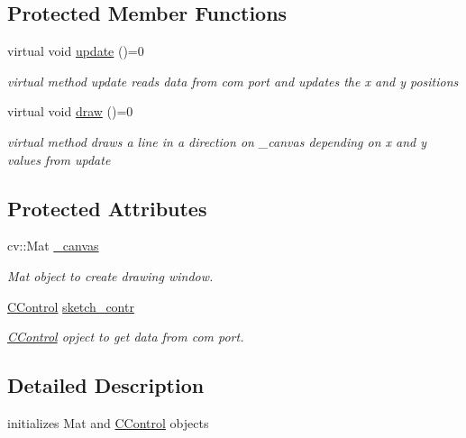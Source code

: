 \subsection*{Protected Member Functions}
\begin{DoxyCompactItemize}
\item 
virtual void \hyperlink{class_c_base4618_a1e2f3c16eb99b5bfdd5d5254aee39ee6}{update} ()=0
\begin{DoxyCompactList}\small\item\em virtual method update reads data from com port and updates the x and y positions \end{DoxyCompactList}\item 
virtual void \hyperlink{class_c_base4618_a0987bf28e9beed4753d3628fcddc3315}{draw} ()=0
\begin{DoxyCompactList}\small\item\em virtual method draws a line in a direction on \+\_\+canvas depending on x and y values from update \end{DoxyCompactList}\end{DoxyCompactItemize}
\subsection*{Protected Attributes}
\begin{DoxyCompactItemize}
\item 
\hypertarget{class_c_base4618_a1b925f757247b33ca2072f777f24582d}{}\label{class_c_base4618_a1b925f757247b33ca2072f777f24582d} 
cv\+::\+Mat \hyperlink{class_c_base4618_a1b925f757247b33ca2072f777f24582d}{\+\_\+canvas}
\begin{DoxyCompactList}\small\item\em Mat object to create drawing window. \end{DoxyCompactList}\item 
\hypertarget{class_c_base4618_ac838c5eaf9edfb1e607bd90e4e246a37}{}\label{class_c_base4618_ac838c5eaf9edfb1e607bd90e4e246a37} 
\hyperlink{class_c_control}{C\+Control} \hyperlink{class_c_base4618_ac838c5eaf9edfb1e607bd90e4e246a37}{sketch\+\_\+contr}
\begin{DoxyCompactList}\small\item\em \hyperlink{class_c_control}{C\+Control} opject to get data from com port. \end{DoxyCompactList}\end{DoxyCompactItemize}


\subsection{Detailed Description}
initializes Mat and \hyperlink{class_c_control}{C\+Control} objects 

